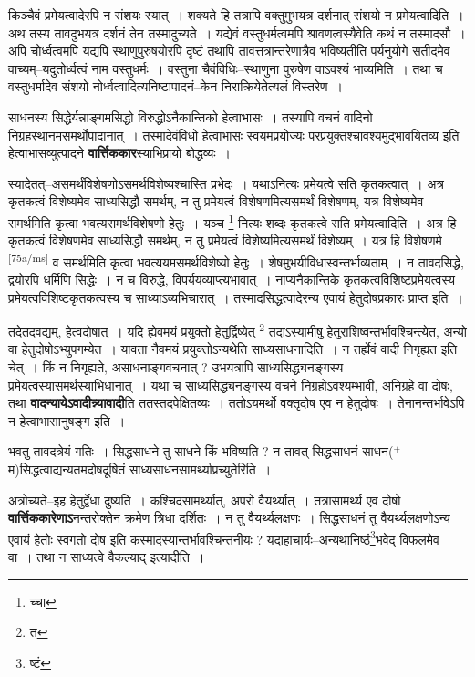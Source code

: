 \documentclass[article,12pt,a4paper]{memoir}
\newcommand{\add}[1]{($^{+}$#1)}
\begin{document}
	  \pstart किञ्चैवं प्रमेयत्वादेरपि न संशयः स्यात् । शक्यते हि तत्रापि वक्तुमुभयत्र दर्शनात् संशयो न प्रमेयत्वादिति । अथ तस्य तावदुभयत्र दर्शनं तेन तस्मादुच्यते । यद्येवं वस्तुधर्मत्वमपि श्रावणत्वस्यैवेति कथं न तस्मादसौ । अपि चोर्ध्वत्वमपि यद्यपि स्थाणुपुरुषयोरपि दृष्टं तथापि तावत्तत्रान्तरेणात्रैव भविष्यतीति पर्यनुयोगे सतीदमेव वाच्यम्--यदुतोर्ध्वत्वं नाम वस्तुधर्मः । वस्तुना चैवंविधिः--स्थाणुना पुरुषेण वाऽवश्यं भाव्यमिति । तथा च वस्तुधर्मादेव संशयो नोर्ध्वत्वादित्यनिष्टापादनं--केन निराक्रियेतेत्यलं विस्तरेण ।
	\pend
      

	  \pstart साधनस्य सिद्धेर्यन्नाङ्गमसिद्धो विरुद्धोऽनैकान्तिको हेत्वाभासः । तस्यापि वचनं वादिनो निग्रहस्थानमसमर्थोपादानात् । तस्मादेवंविधो हेत्वाभासः स्वयमप्रयोज्यः परप्रयुक्तश्चावश्यमुद्भावयितव्य इति हेत्वाभासव्युत्पादने \textbf{वार्त्तिककार}स्याभिप्रायो बोद्धव्यः ।
	\pend
      

	  \pstart स्यादेतत्--असमर्थंविशेषणोऽसमर्थविशेष्यश्चास्ति प्रभेदः । यथाऽनित्यः प्रमेयत्वे सति कृतकत्वात् । अत्र कृतकत्वं विशेष्यमेव साध्यसिद्धौ समर्थम्, न तु प्रमेयत्वं विशेषणमित्यसमर्थं विशेषणम्, यत्र विशेष्यमेव समर्थमिति कृत्वा भवत्यसमर्थविशेषणो हेतुः । यञ्च \footnote{च्चा} नित्यः शब्दः कृतकत्वे सति प्रमेयत्वादिति । अत्र हि कृतकत्वं विशेषणमेव साध्यसिद्धौ समर्थम्, न तु प्रमेयत्वं विशेष्यमित्यसमर्थं विशेष्यम् । यत्र हि विशेषणमे \leavevmode\textsuperscript{\rmlatinfont\tiny [75a/ms]} व समर्थमिति कृत्वा भवत्ययमसमर्थविशेष्यो हेतुः । शेषमुभयीविधास्वन्तर्भाव्यताम् । न तावदसिद्धे, द्वयोरपि धर्मिणि सिद्धेः । न च विरुद्धे, विपर्ययव्याप्त्यभावात् । नाप्यनैकान्तिके कृतकत्वविशिष्टप्रमेयत्वस्य प्रमेयत्वविशिष्टकृतकत्वस्य च साध्याऽव्यभिचारात् । तस्मादसिद्धत्वादेरन्य एवायं हेतुदोषप्रकारः प्राप्त इति ।
	\pend
      

	  \pstart तदेतदवद्यम्, हेत्वदोषात् । यदि ह्येवमयं प्रयुक्तो हेतुर्द्विष्येत् \footnote{त} तदाऽस्यामीषु हेतुराशिष्वन्तर्भावश्चिन्त्येत, अन्यो वा हेतुदोषोऽभ्युपगम्येत । यावता नैवमयं प्रयुक्तोऽन्यथेति साध्यसाधनादिति । न तर्ह्येवं वादी निगृह्यत इति चेत् । किं न निगृह्यते, असाधनाङ्गवचनात् ? उभयत्रापि साध्यसिद्ध्यनङ्गस्य प्रमेयत्वस्यासमर्थस्याभिधानात् । यथा च साध्यसिद्ध्यनङ्गस्य वचने निग्रहोऽवश्यम्भावी, अनिग्रहे वा दोषः, तथा \textbf{वादन्यायेऽवादीन्न्यावादी}ति ततस्तदपेक्षितव्यः । ततोऽयमर्थो वक्तृदोष एव न हेतुदोषः । तेनानन्तर्भावेऽपि न हेत्वाभासानुषङ्ग इति ।
	\pend
      

	  \pstart भवतु तावदत्रेयं गतिः । सिद्धसाधने तु साधने किं भविष्यति ? न तावत् सिद्धसाधनं साधन\add{म}सिद्धत्वाद्यन्यतमदोषदूषितं साध्यसाधनसामर्थ्याप्रच्युतेरिति ।
	\pend
      

	  \pstart अत्रोच्यते--इह हेतुर्द्वेधा दुष्यति । कश्चिदसामर्थ्यात्, अपरो वैयर्थ्यात् । तत्रासामर्थ्य एव दोषो \textbf{वार्त्तिककारेणाऽ}नन्तरोक्तेन क्रमेण त्रिधा दर्शितः । न तु वैयर्थ्यलक्षणः । सिद्धसाधनं तु वैयर्थ्यलक्षणोऽन्य एवायं हेतोः स्वगतो दोष इति कस्मादस्यान्तर्भावश्चिन्तनीयः ? यदाहाचार्यः--अन्यथानिष्ठं\footnote{ष्टं}भवेद् विफलमेव वा । तथा न साध्यत्वे वैकल्याद् इत्यादीति ।
	\pend
      
\end{document}
